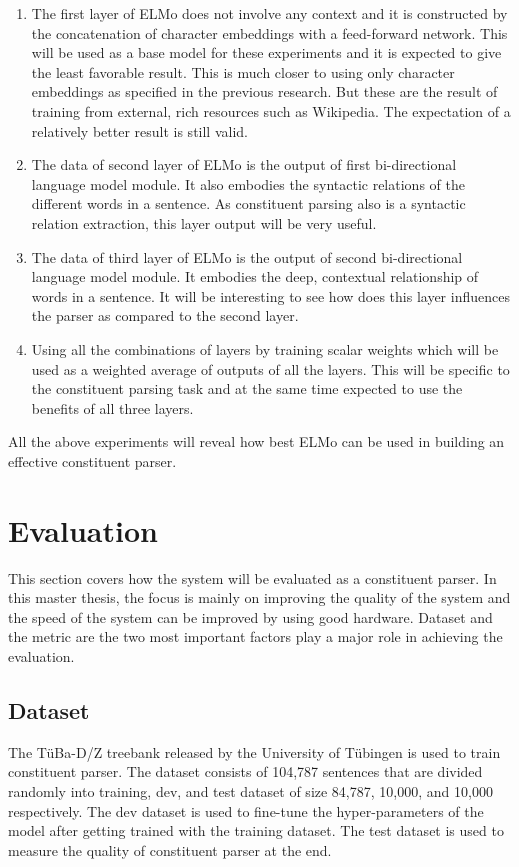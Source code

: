 \documentclass[a4paper, 11pt]{article}
\begin{document}
\begin{enumerate}
\item The first layer of ELMo does not involve any context and it is constructed by the concatenation of character embeddings with a feed-forward network. This will be used as a base model for these experiments and it is expected to give the least favorable result. This is much closer to using only character embeddings as specified in the previous research. But these are the result of training from external, rich resources such as Wikipedia. The expectation of a relatively better result is still valid.
\item The data of second layer of ELMo is the output of first bi-directional language model module. It also embodies the syntactic relations of the different words in a sentence. As constituent parsing also is a syntactic relation extraction, this layer output will be very useful. 
\item The data of third layer of ELMo is the output of second bi-directional language model module. It embodies the deep, contextual relationship of words in a sentence. It will be interesting to see how does this layer influences the parser as compared to the second layer.   
\item Using all the combinations of layers by training scalar weights which will be used as a weighted average of outputs of all the layers. This will be specific to the constituent parsing task and at the same time expected to use the benefits of all three layers. 
\end{enumerate}

All the above experiments will reveal how best ELMo can be used in building an effective constituent parser. 


\pagebreak
\section{Evaluation}

This section covers how the system will be evaluated as a constituent parser. In this master thesis, the focus is mainly on improving the quality of the system and the speed of the system can be improved by using good hardware. Dataset and the metric are the two most important factors play a major role in achieving the evaluation. 
\subsection{Dataset}

The TüBa-D/Z treebank \parencite{TubingenTreebank} released by the University of Tübingen is used to train constituent parser. The dataset consists of 104,787 sentences that are divided randomly into training, dev, and test dataset of size 84,787, 10,000, and 10,000 respectively. The dev dataset is used to fine-tune the hyper-parameters of the model after getting trained with the training dataset. The test dataset is used to measure the quality of constituent parser at the end. 
\end{document}
